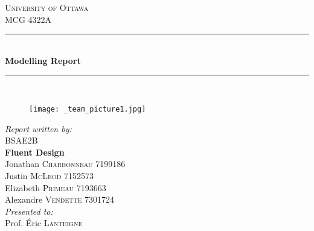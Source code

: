 \documentclass[12pt,twoside]{article}
\begin{document}
	
	\begin{titlepage}
		
		\newcommand{\HRule}{\rule{\linewidth}{0.5mm}} %
		
		\begin{center} %
			
			
			\textsc{\LARGE University of Ottawa}\\[1.0cm] %
			\textsc{\Large MCG 4322A}\\[0.5cm] %
			
			
			\HRule \\[0.4cm]
			{ \huge \bfseries Modelling Report}\\[0.4cm] %
			\HRule \\[0.5cm]
			
			\begin{figure}[H]
				\centering
				\texttt{[image: \_team\_picture1.jpg]} %
			\end{figure}
			
			
			\emph{Report written by:}\\[0.5cm]
			BSAE2B\\
			\textbf{Fluent Design}\\
			Jonathan \textsc{Charbonneau} 7199186\\
			Justin \textsc{McLeod} 7152573\\
			Elizabeth \textsc{Primeau} 7193663\\
			Alexandre \textsc{Vendette} 7301724\\[1cm]
			\emph{Presented to:}\\[0.5cm]
			Prof. Éric \textsc{Lanteigne}\\[1.5cm]
			

\end{center}
\end{titlepage}
\end{document}
